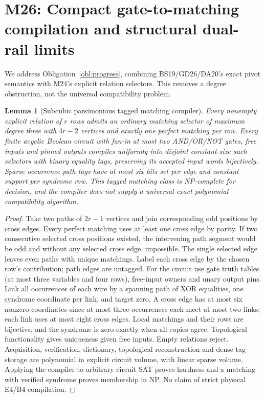 \documentclass[11pt]{article}
\newtheorem{lemma}[theorem]{Lemma}
\begin{document}
\section{M26: Compact gate-to-matching compilation and structural dual-rail limits}\label{sec:m26}
We address Obligation~\ref{obl:progress}, combining BS19/GD26/DA20's exact pivot semantics with M24's explicit relation selectors. This removes a degree obstruction, not the universal compatibility problem.
\begin{lemma}[Subcubic parsimonious tagged matching compiler]\label{lem:m26-selector}
Every nonempty explicit relation of $r$ rows admits an ordinary matching selector of maximum degree three with $4r-2$ vertices and exactly one perfect matching per row. Every finite acyclic Boolean circuit with fan-in at most two AND/OR/NOT gates, free inputs and pinned outputs compiles uniformly into disjoint constant-size such selectors with binary equality tags, preserving its accepted input words bijectively. Sparse occurrence-path tags have at most six bits set per edge and constant support per syndrome row. This tagged matching class is NP-complete for decision, and the compiler does not supply a universal exact polynomial compatibility algorithm.
\end{lemma}
\begin{proof}
Take two paths of $2r-1$ vertices and join corresponding odd positions by cross edges. Every perfect matching uses at least one cross edge by parity. If two consecutive selected cross positions existed, the intervening path segment would be odd and without any selected cross edge, impossible. The single selected edge leaves even paths with unique matchings. Label each cross edge by the chosen row's contribution; path edges are untagged. For the circuit use gate truth tables (at most three variables and four rows), free-input owners and unary output pins. Link all occurrences of each wire by a spanning path of XOR equalities, one syndrome coordinate per link, and target zero. A cross edge has at most six nonzero coordinates since at most three occurrences each meet at most two links; each link uses at most eight cross edges. Local matchings and their rows are bijective, and the syndrome is zero exactly when all copies agree. Topological functionality gives uniqueness given free inputs. Empty relations reject. Acquisition, verification, dictionary, topological reconstruction and dense tag storage are polynomial in explicit circuit volume, with linear sparse volume. Applying the compiler to arbitrary circuit SAT proves hardness and a matching with verified syndrome proves membership in NP. No claim of strict physical E4/B4 compilation.
\end{proof}
\end{document}
